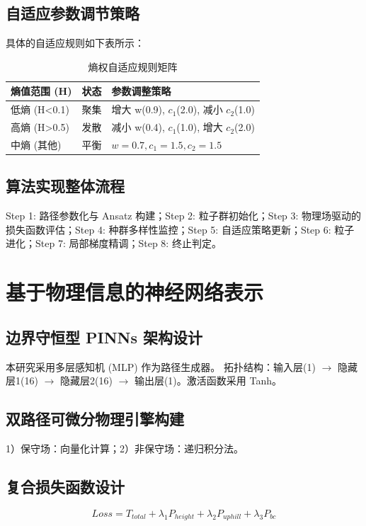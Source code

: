 \documentclass[twocolumn, UTF8, a4paper]{ctexart}
\newcommand{\xiaosi}{\fontsize{12pt}{15pt}\selectfont}
\begin{document}
	\subsection{自适应参数调节策略}
	具体的自适应规则如下表所示：
	
	\begin{table}[h]
		\caption{熵权自适应规则矩阵}
		\xiaosi
		\begin{tabular}{lp{1.2cm}p{3.5cm}}
			\toprule
			熵值范围 (H) & 状态 & 参数调整策略 \\
			\midrule
			低熵 (H<0.1) & 聚集 & 增大 w(0.9), $c_1$(2.0), 减小 $c_2$(1.0) \\
			高熵 (H>0.5) & 发散 & 减小 w(0.4), $c_1$(1.0), 增大 $c_2$(2.0) \\
			中熵 (其他) & 平衡 & $w=0.7, c_1=1.5, c_2=1.5$ \\
			\bottomrule
		\end{tabular}
	\end{table}
	
	\subsection{算法实现整体流程}
	Step 1: 路径参数化与 Ansatz 构建；Step 2: 粒子群初始化；Step 3: 物理场驱动的损失函数评估；Step 4: 种群多样性监控；Step 5: 自适应策略更新；Step 6: 粒子进化；Step 7: 局部梯度精调；Step 8: 终止判定。
	
	\section{基于物理信息的神经网络表示}
	
	\subsection{边界守恒型 PINNs 架构设计}
	本研究采用多层感知机 (MLP) 作为路径生成器。
	拓扑结构：输入层(1) $\rightarrow$ 隐藏层1(16) $\rightarrow$ 隐藏层2(16) $\rightarrow$ 输出层(1)。激活函数采用 Tanh。
	
	\subsection{双路径可微分物理引擎构建}
	1）保守场：向量化计算；2）非保守场：递归积分法。
	
	\subsection{复合损失函数设计}
	\begin{equation}
		Loss = T_{total} + \lambda_1 P_{height} + \lambda_2 P_{uphill} + \lambda_3 P_{bc}
	\end{equation}
	
\end{document}
